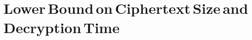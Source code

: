 \section[Lower Bound on Ciphertext Size and Decryption Time]{Lower\,Bound\,on\,Ciphertext\,Size\,and\,Decryption\,Time}\label{sec:lower-bound}












